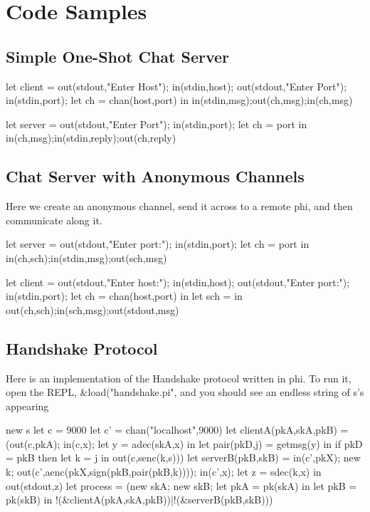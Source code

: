 \section{Code Samples}

\subsection{Simple One-Shot Chat Server}

\begin{code}
let client = 
    out(stdout,"Enter Host"); in(stdin,host);
    out(stdout,"Enter Port"); in(stdin,port);
        let ch = chan(host,port) in
            in(stdin,msg);out(ch,msg);in(ch,msg)
\end{code}

\begin{code}
let server = 
out(stdout,"Enter Port");
in(stdin,port);
    let ch = {port} in
        in(ch,msg);in(stdin,reply);out(ch,reply)
\end{code}

\subsection{Chat Server with Anonymous Channels}
\label{sec:clientserverfancy}
Here we create an anonymous channel, send it across to a remote phi, and then communicate along it.

\begin{code}
let server = 
    out(stdout,"Enter port:"); in(stdin,port);
    let ch = {port} in 
        in(ch,sch);in(stdin,msg);out(sch,msg)
\end{code}
\begin{code}
let client = 
    out(stdout,"Enter host:"); in(stdin,host);
    out(stdout,"Enter port:"); in(stdin,port);
    let ch = chan(host,port) in
        let sch = {} in
            out(ch,sch);in(sch,msg);out(stdout,msg)
\end{code}

\subsection{Handshake Protocol}
\label{sec:handshake}

Here is an implementation of the Handshake protocol written in phi. To run it, open the REPL, \&load("handshake.pi", and you should see an endless string of s's appearing

\begin{code}
new s
let c = {9000}
let c' = chan("localhost",9000)
let clientA(pkA,skA,pkB) =  
    (out(c,pkA); in(c,x); 
    let y = adec(skA,x) in
    let pair(pkD,j) = getmsg(y) in if pkD = pkB then let k = j in
    out(c,senc(k,s)))
let serverB(pkB,skB) = 
    in(c',pkX);
    new k;
    out(c',aenc(pkX,sign(pkB,pair(pkB,k))));
    in(c',x);
    let z = sdec(k,x) in out(stdout,z)
let process = 
    (new skA;
    new skB;
    let pkA = pk(skA) in
    let pkB = pk(skB) in
    !(&clientA(pkA,skA,pkB))|!(&serverB(pkB,skB)))
\end{code}

